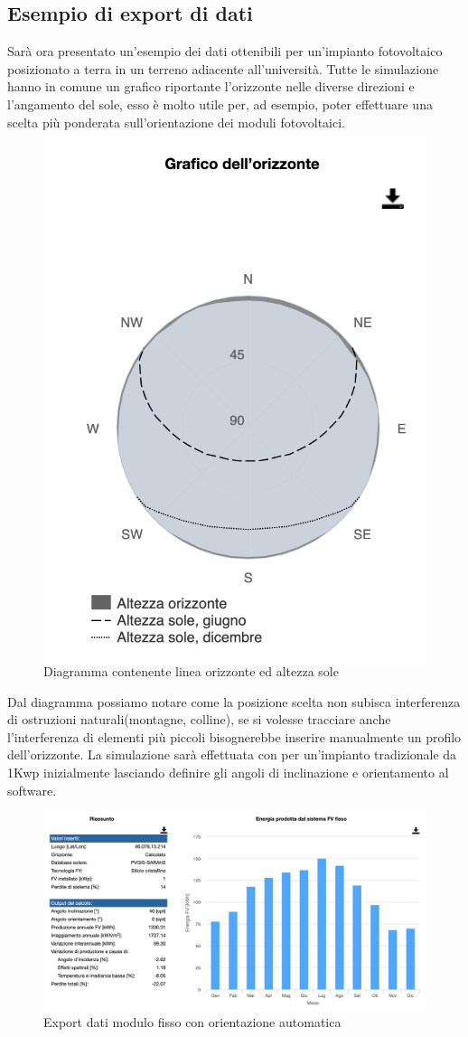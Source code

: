 \subsection{Esempio di export di dati}
Sarà ora presentato un'esempio dei dati ottenibili per un'impianto fotovoltaico posizionato a terra in un terreno adiacente all'università.
Tutte le simulazione hanno in comune un grafico riportante l'orizzonte nelle diverse direzioni e l'angamento del sole, esso è molto utile per, ad esempio, poter effettuare una scelta più ponderata sull'orientazione dei moduli fotovoltaici.
\begin{figure}[H]
    \centering
    \includegraphics[height=0.5\textwidth]{res/cap 4/orizzonte}
    \caption{Diagramma contenente linea orizzonte ed altezza sole}
\end{figure}\noindent
Dal diagramma possiamo notare come la posizione scelta non subisca interferenza di ostruzioni naturali(montagne, colline), se si volesse tracciare anche l'interferenza di elementi più piccoli bisognerebbe inserire manualmente un profilo dell'orizzonte.
La simulazione sarà effettuata con per un'impianto tradizionale da 1Kwp inizialmente lasciando definire gli angoli di inclinazione e orientamento al software.
\begin{figure}[H]
    \centering
    \includegraphics[height=0.5\textwidth]{res/cap 4/fissi uniud-auto}
    \caption{Export dati modulo fisso con orientazione automatica}
\end{figure}\noindent
